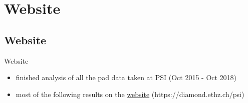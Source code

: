 \section{Website}
\subsection{Website}
\begin{frame}{Website}

	\vspace*{-2ex}
	\begin{itemize}\itemfill
		\item finished analysis of all the pad data taken at PSI (Oct 2015 - Oct 2018)
		\item most of the following results on the \href{https://diamond.ethz.ch/psi/}{website} (https://diamond.ethz.ch/psi)
	\end{itemize}\vspace*{-2ex}

	
\end{frame}

